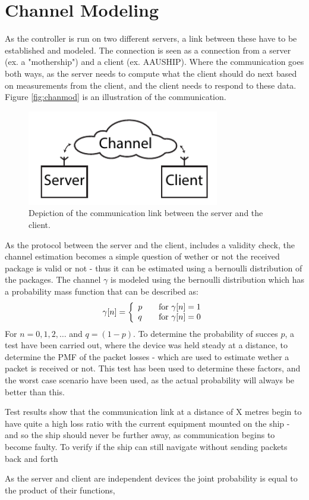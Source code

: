 \chapter{Channel Modeling}
As the controller is run on two different servers, a link between these have to be established and modeled. The connection is seen as a connection from a server (ex. a "mothership") and a client (ex. AAUSHIP). Where the communication goes both ways, as the server needs to compute what the client should do next based on measurements from the client, and the client needs to respond to these data. Figure \vref{fig:chanmod} is an illustration of the communication. 

\begin{figure}[htbp]
		\begin{center}
			\includegraphics[width=8.4cm]{img/chanmod}
			\caption{Depiction of the communication link between the server and the client.}
			\label{fig:chanmod}
		\end{center}
\end{figure}

As the protocol between the server and the client, includes a validity check, the channel estimation becomes a simple question of wether or not the received package is valid or not - thus it can be estimated using a bernoulli distribution of the packages. The channel $\gamma$ is modeled using the bernoulli distribution which has a probability mass function that can be described as:
\begin{align}
\gamma[n] = 
\left\{ 
  \begin{array}{l l}
    p & \quad \text{for}\,\, \gamma[n] = 1\\
    q & \quad \text{for}\,\, \gamma[n] = 0
  \end{array} \right.
\end{align}
For $n = 0,1,2,\dots$ and $q = (1-p)$. To determine the probability of succes $p$, a test have been carried out, where the device was held steady at a distance, to determine the PMF of the packet losses - which are used to estimate wether a packet is received or not. This test has been used to determine these factors, and the worst case scenario have been used, as the actual probability will always be better than this. 



Test results show that the communication link at a distance of X metres begin to have quite a high loss ratio with the current equipment mounted on the ship - and so the ship should never be further away, as communication begins to become faulty. To verify if the ship can still navigate without sending packets back and forth 

As the server and client are independent devices the joint probability is equal to the product of their functions, 